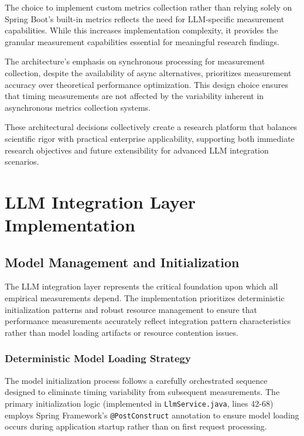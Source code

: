 The choice to implement custom metrics collection rather than relying solely on Spring Boot's built-in metrics reflects the need for LLM-specific measurement capabilities. While this increases implementation complexity, it provides the granular measurement capabilities essential for meaningful research findings.

The architecture's emphasis on synchronous processing for measurement collection, despite the availability of async alternatives, prioritizes measurement accuracy over theoretical performance optimization. This design choice ensures that timing measurements are not affected by the variability inherent in asynchronous metrics collection systems.

These architectural decisions collectively create a research platform that balances scientific rigor with practical enterprise applicability, supporting both immediate research objectives and future extensibility for advanced LLM integration scenarios.



\chapter{LLM Integration Layer Implementation}

\section{Model Management and Initialization}

The LLM integration layer represents the critical foundation upon which all empirical measurements depend. The implementation prioritizes deterministic initialization patterns and robust resource management to ensure that performance measurements accurately reflect integration pattern characteristics rather than model loading artifacts or resource contention issues.

\subsection{Deterministic Model Loading Strategy}

The model initialization process follows a carefully orchestrated sequence designed to eliminate timing variability from subsequent measurements. The primary initialization logic (implemented in \texttt{LlmService.java}, lines 42-68) employs Spring Framework's \texttt{@PostConstruct} annotation to ensure model loading occurs during application startup rather than on first request processing.

